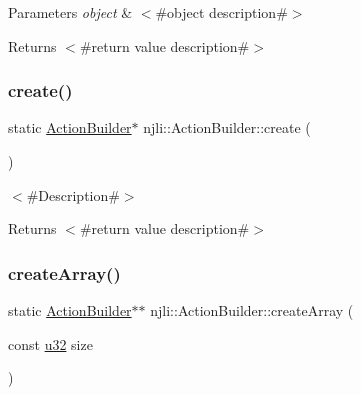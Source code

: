 \begin{DoxyParams}{Parameters}
{\em object} & $<$\#object description\#$>$\\
\hline
\end{DoxyParams}
\begin{DoxyReturn}{Returns}
$<$\#return value description\#$>$ 
\end{DoxyReturn}
\mbox{\label{classnjli_1_1_action_builder_a8bbc5b7faffee5487928032a955bba6b}} 
\subsubsection{\texorpdfstring{create()}{create()}}
{\footnotesize\ttfamily static \mbox{\hyperlink{classnjli_1_1_action_builder}{Action\+Builder}}$\ast$ njli\+::\+Action\+Builder\+::create (\begin{DoxyParamCaption}{ }\end{DoxyParamCaption})\hspace{0.3cm}{\ttfamily [static]}}

$<$\#\+Description\#$>$

\begin{DoxyReturn}{Returns}
$<$\#return value description\#$>$ 
\end{DoxyReturn}
\mbox{\label{classnjli_1_1_action_builder_a43d1a1223217032a1c9e1f7c0312b89a}} 
\subsubsection{\texorpdfstring{create\+Array()}{createArray()}}
{\footnotesize\ttfamily static \mbox{\hyperlink{classnjli_1_1_action_builder}{Action\+Builder}}$\ast$$\ast$ njli\+::\+Action\+Builder\+::create\+Array (\begin{DoxyParamCaption}\item[{const \mbox{\hyperlink{_util_8h_a10e94b422ef0c20dcdec20d31a1f5049}{u32}}}]{size }\end{DoxyParamCaption})\hspace{0.3cm}{\ttfamily [static]}}


